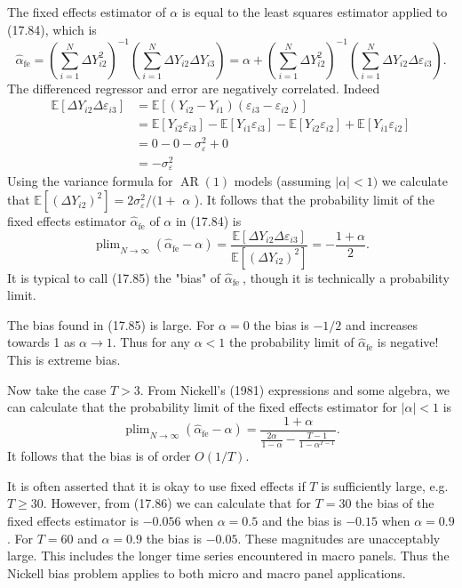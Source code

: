 \documentclass[10pt]{article}
\begin{document}
The fixed effects estimator of $\alpha$ is equal to the least squares estimator applied to (17.84), which is
$$
\widehat{\alpha}_{\mathrm{fe}}=\left(\sum_{i=1}^{N} \Delta Y_{i 2}^{2}\right)^{-1}\left(\sum_{i=1}^{N} \Delta Y_{i 2} \Delta Y_{i 3}\right)=\alpha+\left(\sum_{i=1}^{N} \Delta Y_{i 2}^{2}\right)^{-1}\left(\sum_{i=1}^{N} \Delta Y_{i 2} \Delta \varepsilon_{i 3}\right) .
$$
The differenced regressor and error are negatively correlated. Indeed
$$
\begin{aligned}
\mathbb{E}\left[\Delta Y_{i 2} \Delta \varepsilon_{i 3}\right] &=\mathbb{E}\left[\left(Y_{i 2}-Y_{i 1}\right)\left(\varepsilon_{i 3}-\varepsilon_{i 2}\right)\right] \\
&=\mathbb{E}\left[Y_{i 2} \varepsilon_{i 3}\right]-\mathbb{E}\left[Y_{i 1} \varepsilon_{i 3}\right]-\mathbb{E}\left[Y_{i 2} \varepsilon_{i 2}\right]+\mathbb{E}\left[Y_{i 1} \varepsilon_{i 2}\right] \\
&=0-0-\sigma_{\varepsilon}^{2}+0 \\
&=-\sigma_{\varepsilon}^{2}
\end{aligned}
$$
Using the variance formula for $\operatorname{AR}(1)$ models (assuming $|\alpha|<1)$ we calculate that $\mathbb{E}\left[\left(\Delta Y_{i 2}\right)^{2}\right]=2 \sigma_{\varepsilon}^{2} /(1+$ $\alpha$ ). It follows that the probability limit of the fixed effects estimator $\widehat{\alpha}_{\mathrm{fe}}$ of $\alpha$ in (17.84) is
$$
\operatorname{plim}_{N \rightarrow \infty}\left(\widehat{\alpha}_{\mathrm{fe}}-\alpha\right)=\frac{\mathbb{E}\left[\Delta Y_{i 2} \Delta \varepsilon_{i 3}\right]}{\mathbb{E}\left[\left(\Delta Y_{i 2}\right)^{2}\right]}=-\frac{1+\alpha}{2} .
$$
It is typical to call (17.85) the "bias" of $\widehat{\alpha}_{\text {fe }}$, though it is technically a probability limit.

The bias found in (17.85) is large. For $\alpha=0$ the bias is $-1 / 2$ and increases towards 1 as $\alpha \rightarrow 1$. Thus for any $\alpha<1$ the probability limit of $\widehat{\alpha}_{\mathrm{fe}}$ is negative! This is extreme bias.

Now take the case $T>3$. From Nickell's (1981) expressions and some algebra, we can calculate that the probability limit of the fixed effects estimator for $|\alpha|<1$ is
$$
\operatorname{plim}_{N \rightarrow \infty}\left(\widehat{\alpha}_{\mathrm{fe}}-\alpha\right)=\frac{1+\alpha}{\frac{2 \alpha}{1-\alpha}-\frac{T-1}{1-\alpha^{T-1}}} .
$$
It follows that the bias is of order $O(1 / T)$.

It is often asserted that it is okay to use fixed effects if $T$ is sufficiently large, e.g. $T \geq 30$. However, from (17.86) we can calculate that for $T=30$ the bias of the fixed effects estimator is $-0.056$ when $\alpha=0.5$ and the bias is $-0.15$ when $\alpha=0.9$. For $T=60$ and $\alpha=0.9$ the bias is $-0.05$. These magnitudes are unacceptably large. This includes the longer time series encountered in macro panels. Thus the Nickell bias problem applies to both micro and macro panel applications.
\end{document}
